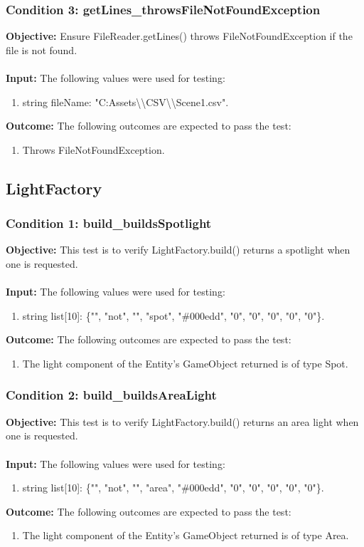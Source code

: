 \documentclass[a4paper,12pt]{article}
\begin{document}
		\subsubsection{Condition 3: getLines\_throwsFileNotFoundException}
			\textbf{Objective:} Ensure FileReader.getLines() throws FileNotFoundException if the file is not found.\\\\
			\textbf{Input:} The following values were used for testing:
				\begin{enumerate}
					\item string fileName: "C:Assets\textbackslash \textbackslash CSV\textbackslash \textbackslash Scene1.csv".
				\end{enumerate}
			\textbf{Outcome:} The following outcomes are expected to pass the test:
				\begin{enumerate}
					\item Throws FileNotFoundException.
				\end{enumerate}
	\subsection{LightFactory}
		\subsubsection{Condition 1: build\_buildsSpotlight}
			\textbf{Objective:} This test is to verify  LightFactory.build() returns a spotlight when one is requested.\\\\
			\textbf{Input:} The following values were used for testing:
				\begin{enumerate}
					\item string list[10]: \{"", "not", "", "spot", "\#000edd", "0", "0", "0", "0", "0"\}.
				\end{enumerate}
			\textbf{Outcome:} The following outcomes are expected to pass the test:
				\begin{enumerate}
					\item The light component of the Entity's GameObject returned is of type Spot.
				\end{enumerate}
		\subsubsection{Condition 2: build\_buildsAreaLight}
			\textbf{Objective:} This test is to verify  LightFactory.build() returns an area light when one is requested.\\\\
			\textbf{Input:} The following values were used for testing:
				\begin{enumerate}
					\item string list[10]: \{"", "not", "", "area", "\#000edd", "0", "0", "0", "0", "0"\}.
				\end{enumerate}
			\textbf{Outcome:} The following outcomes are expected to pass the test:
				\begin{enumerate}
					\item The light component of the Entity's GameObject returned is of type Area.
				\end{enumerate}
\end{document}

